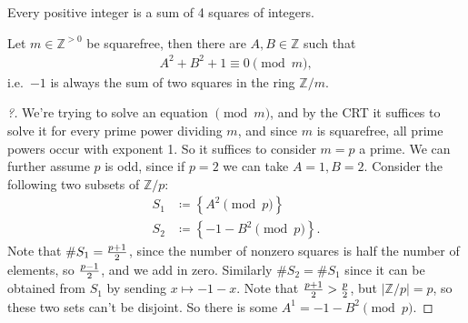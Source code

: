 \begin{theorem}

Every positive integer is a sum of 4 squares of integers.

\end{theorem}

\begin{lemma}[?]

Let \(m \in {\mathbb{Z}}^{>0}\) be squarefree, then there are
\(A, B \in {\mathbb{Z}}\) such that
\begin{align*}
A^2 + B^2 + 1 \equiv 0 \pmod m
,\end{align*}
i.e.~\(-1\) is always the sum of two squares in the ring
\({\mathbb{Z}}/m\).

\end{lemma}

\begin{proof}[?]

We're trying to solve an equation \(\pmod m\), and by the CRT it
suffices to solve it for every prime power dividing \(m\), and since
\(m\) is squarefree, all prime powers occur with exponent 1. So it
suffices to consider \(m=p\) a prime. We can further assume \(p\) is
odd, since if \(p=2\) we can take \(A=1, B=2\). Consider the following
two subsets of \({\mathbb{Z}}/p\):
\begin{align*}
S_1 &\coloneqq\left\{{ A^2 \pmod p }\right\} \\
S_2 &\coloneqq\left\{{ -1-B^2 \pmod p }\right\} 
.\end{align*}
Note that \(\# S_1 = {p+1 \over 2}\), since the number of nonzero
squares is half the number of elements, so \({p-1\over 2}\), and we add
in zero. Similarly \(\# S_2 = \# S_1\) since it can be obtained from
\(S_1\) by sending \(x\mapsto -1-x\). Note that
\({p+1\over 2} > {p\over 2}\), but
\({\left\lvert {{\mathbb{Z}}/p} \right\rvert} = p\), so these two sets
can't be disjoint. So there is some \(A^1 = -1-B^2 \pmod p\).

\end{proof}

